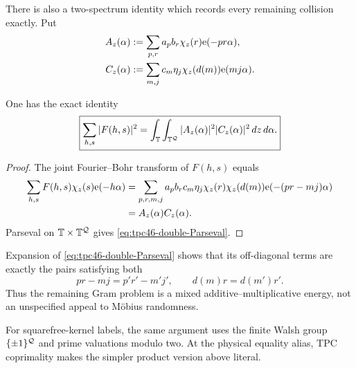 There is also a two-spectrum identity which records every remaining
collision exactly.  Put
\begin{align}
 A_z(\alpha)
 &:=
 \sum_{p,r}a_pb_r\chi_z(r)\mathrm e(-pr\alpha),
 \label{eq:tpc46-Az}\\
 C_z(\alpha)
 &:=
 \sum_{m,j}c_m\eta_j\chi_z(d(m))\mathrm e(mj\alpha).
 \label{eq:tpc46-Cz}
\end{align}

\begin{theorem}
\label{thm:tpc46-double-Parseval}
One has the exact identity
\begin{equation}
 \boxed{
 \sum_{h,s}|F(h,s)|^2
 =\int_{\mathbb T}\int_{\mathbb T^{\mathcal Q}}
 |A_z(\alpha)|^2|C_z(\alpha)|^2\,dz\,d\alpha.}
 \label{eq:tpc46-double-Parseval}
\end{equation}
\end{theorem}

\begin{proof}
The joint Fourier--Bohr transform of \(F(h,s)\) equals
\begin{align*}
 \sum_{h,s}F(h,s)\chi_z(s)\mathrm e(-h\alpha)
 &=\sum_{p,r,m,j}a_pb_rc_m\eta_j
   \chi_z(r)\chi_z(d(m))
   \mathrm e(-(pr-mj)\alpha)\\
 &=A_z(\alpha)C_z(\alpha).
\end{align*}
Parseval on \(\mathbb T\times\mathbb T^{\mathcal Q}\) gives
\eqref{eq:tpc46-double-Parseval}.
\end{proof}

Expansion of \eqref{eq:tpc46-double-Parseval} shows that its
off-diagonal terms are exactly the pairs satisfying both
\begin{equation}
 pr-mj=p'r'-m'j',
 \qquad
 d(m)r=d(m')r'.
 \label{eq:tpc46-mixed-collisions}
\end{equation}
Thus the remaining Gram problem is a mixed additive--multiplicative
energy, not an unspecified appeal to M\"obius randomness.

For squarefree-kernel labels, the same argument uses the finite Walsh
group \(\{\pm1\}^{\mathcal Q}\) and prime valuations modulo two.  At the
physical equality alias, TPC coprimality makes the simpler product
version above literal.

